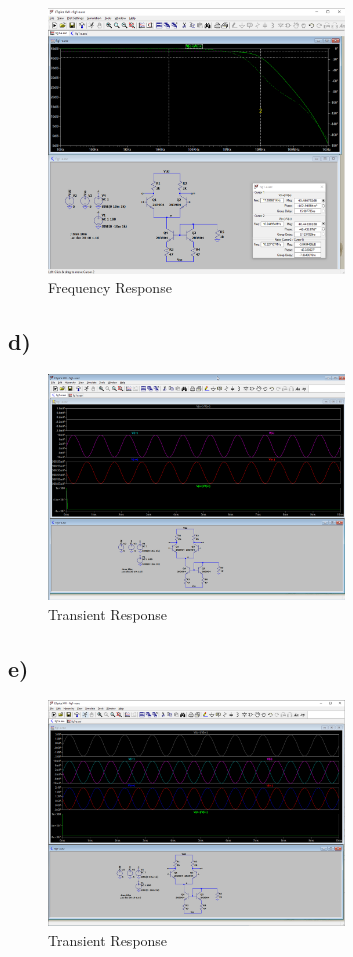 \documentclass{article}
\begin{document}
	\begin{figure}[H]
	    \centering
	    \includegraphics[width=0.7\textwidth]{1c-2}
	    \caption{Frequency Response}
	\end{figure}

	\subsection*{d)}
	
	\begin{figure}[H]
	    \centering
	    \includegraphics[width=0.7\textwidth]{1d-1}
	    \caption{Transient Response}
	\end{figure}
	
	\subsection*{e)}

	\begin{figure}[H]
	    \centering
	    \includegraphics[width=0.7\textwidth]{1e-1}
	    \caption{Transient Response}
	\end{figure}
	
\end{document}
